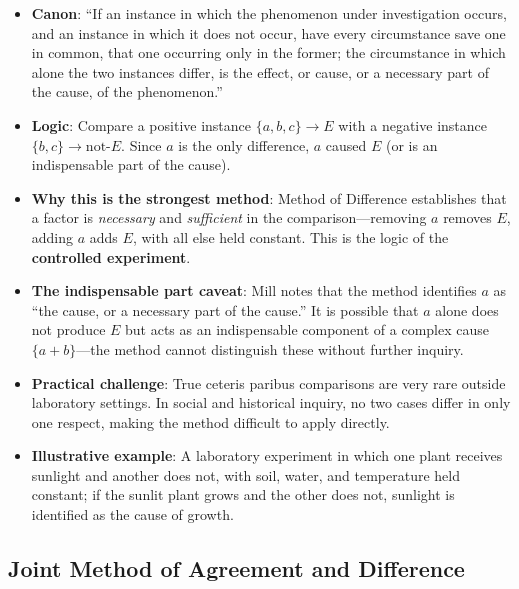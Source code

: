 \documentclass[12pt]{article}
\begin{document}
\begin{itemize}[leftmargin=*, itemsep=4pt]
    \item \textbf{Canon}: ``If an instance in which the phenomenon under investigation occurs, and an instance in which it does not occur, have every circumstance save one in common, that one occurring only in the former; the circumstance in which alone the two instances differ, is the effect, or cause, or a necessary part of the cause, of the phenomenon.''
    \item \textbf{Logic}: Compare a positive instance $\{a, b, c\} \to E$ with a negative instance $\{b, c\} \to \text{not-}E$. Since $a$ is the only difference, $a$ caused $E$ (or is an indispensable part of the cause).
    \item \textbf{Why this is the strongest method}: Method of Difference establishes that a factor is \emph{necessary} and \emph{sufficient} in the comparison---removing $a$ removes $E$, adding $a$ adds $E$, with all else held constant. This is the logic of the \textbf{controlled experiment}.
    \item \textbf{The indispensable part caveat}: Mill notes that the method identifies $a$ as ``the cause, or a necessary part of the cause.'' It is possible that $a$ alone does not produce $E$ but acts as an indispensable component of a complex cause $\{a + b\}$---the method cannot distinguish these without further inquiry.
    \item \textbf{Practical challenge}: True ceteris paribus comparisons are very rare outside laboratory settings. In social and historical inquiry, no two cases differ in only one respect, making the method difficult to apply directly.
    \item \textbf{Illustrative example}: A laboratory experiment in which one plant receives sunlight and another does not, with soil, water, and temperature held constant; if the sunlit plant grows and the other does not, sunlight is identified as the cause of growth.
\end{itemize}

\subsection{Joint Method of Agreement and Difference}
\end{document}
